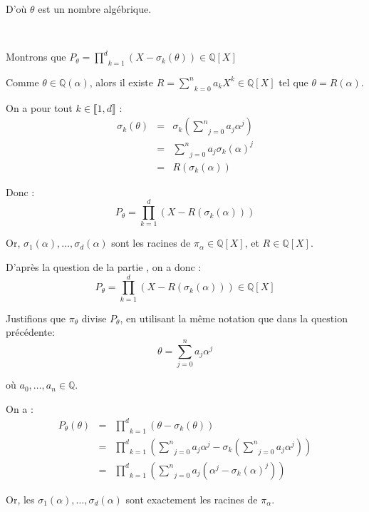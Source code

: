 D'o{\`u} $\theta$ est un nombre alg{\'e}brique.

\

 Montrons que $P_{\theta} = \underset{k =
1}{\overset{d}{\prod}} (X - \sigma_k (\theta)) \in \mathbb{Q} [X]$

Comme $\theta \in \mathbb{Q} (\alpha)$, alors il existe $R = \underset{k =
0}{\overset{n}{\sum}} a_k X^k \in \mathbb{Q} [X]$ tel que $\theta = R
(\alpha)$.

On a pour tout $k \in \llbracket 1, d \rrbracket$ :
\begin{eqnarray*}
  \sigma_k (\theta) & = & \sigma_k \left( \underset{j = 0}{\overset{n}{\sum}}
  a_j \alpha^j \right)\\
  & = & \underset{j = 0}{\overset{n}{\sum}} a_j \sigma_k (\alpha)^j\\
  & = & R (\sigma_k (\alpha))
\end{eqnarray*}


Donc :
\[ P_{\theta} = \underset{k = 1}{\overset{d}{\prod}} (X - R (\sigma_k
   (\alpha))) \]


Or, $\sigma_1 (\alpha), \ldots, \sigma_d (\alpha)$ sont les racines de
$\pi_{\alpha} \in \mathbb{Q} [X]$, et $R \in \mathbb{Q} [X]$.

D'apr{\`e}s la question  de la partie , on a donc :
\[ P_{\theta} = \underset{k = 1}{\overset{d}{\prod}} (X - R (\sigma_k
   (\alpha))) \in \mathbb{Q} [X] \]


 Justifions que $\pi_{\theta}$ divise $P_{\theta}$, en
utilisant la m{\^e}me notation que dans la question pr{\'e}c{\'e}dente:
\[ \theta = \underset{j = 0}{\overset{n}{\sum}} a_j \alpha^j \]


o{\`u} $a_0, \ldots, a_n \in \mathbb{Q}$.

On a :
\begin{eqnarray*}
  P_{\theta} (\theta) & = & \underset{k = 1}{\overset{d}{\prod}} (\theta -
  \sigma_k (\theta))\\
  & = & \underset{k = 1}{\overset{d}{\prod}} \left( \underset{j =
  0}{\overset{n}{\sum}} a_j \alpha^j - \sigma_k \left( \underset{j =
  0}{\overset{n}{\sum}} a_j \alpha^j \right) \right)\\
  & = & \underset{k = 1}{\overset{d}{\prod}} \left( \underset{j =
  0}{\overset{n}{\sum}} a_j (\alpha^j - \sigma_k (\alpha)^j) \right)
\end{eqnarray*}


Or, les $\sigma_1 (\alpha), \ldots, \sigma_d (\alpha)$ sont exactement les
racines de $\pi_{\alpha}$.

